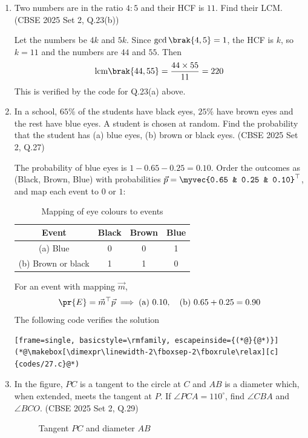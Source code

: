 \begin{enumerate}[label=\thesubsection.\arabic*, ref=\thesubsection.\theenumi]
\item
Two numbers are in the ratio $4:5$ and their HCF is $11$. Find their LCM.
\hfill (CBSE 2025 Set 2, Q.23(b))

\solution
Let the numbers be $4k$ and $5k$. Since $\gcd\brak{4,5} = 1$, the HCF is $k$, so $k = 11$ and the numbers are $44$ and $55$. Then
\begin{align}
	\text{lcm}\brak{44,55} = \frac{44 \times 55}{11} = 220
\end{align}
This is verified by the code for Q.23(a) above.

\item
In a school, $65\%$ of the students have black eyes, $25\%$ have brown eyes and the rest have blue eyes. A student is chosen at random. Find the probability that the student has (a) blue eyes, (b) brown or black eyes.
\hfill (CBSE 2025 Set 2, Q.27)

\solution
The probability of blue eyes is $1 - 0.65 - 0.25 = 0.10$. Order the outcomes as (Black, Brown, Blue) with probabilities $\vec{p} = \myvec{0.65 & 0.25 & 0.10}^{\top}$, and map each event to $0$ or $1$:
\begin{table}[H]
	\centering
	\begin{tabular}{|c|c|c|c|}
		\hline
		Event & Black & Brown & Blue \\ \hline
		(a) Blue & 0 & 0 & 1 \\ \hline
		(b) Brown or black & 1 & 1 & 0 \\ \hline
	\end{tabular}
	\caption{Mapping of eye colours to events}
	\label{tab:CBSE25S2-q27}
\end{table}
For an event with mapping $\vec{m}$,
\begin{align}
	\pr{E} = \vec{m}^{\top}\vec{p} \implies \text{(a) } 0.10, \quad \text{(b) } 0.65 + 0.25 = 0.90
\end{align}
The following code verifies the solution
\begin{lstlisting}[frame=single, basicstyle=\rmfamily, escapeinside={(*@}{@*)}]
(*@\makebox[\dimexpr\linewidth-2\fboxsep-2\fboxrule\relax][c]{codes/27.c}@*)
\end{lstlisting}

\item
In the figure, $PC$ is a tangent to the circle at $C$ and $AB$ is a diameter which, when extended, meets the tangent at $P$. If $\angle PCA = 110^\circ$, find $\angle CBA$ and $\angle BCO$.
\hfill (CBSE 2025 Set 2, Q.29)
\begin{figure}[H]
	\centering

	\caption{Tangent $PC$ and diameter $AB$}
	\label{fig:CBSE25S2-q29}
\end{figure}


\end{enumerate}
